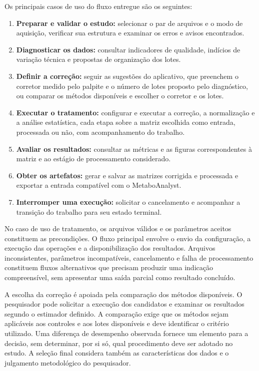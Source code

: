 Os principais casos de uso do fluxo entregue são os seguintes:
\begin{enumerate}
\item \textbf{Preparar e validar o estudo:} selecionar o par de arquivos e o modo de aquisição, verificar sua estrutura e examinar os erros e avisos encontrados.
\item \textbf{Diagnosticar os dados:} consultar indicadores de qualidade, indícios de variação técnica e propostas de organização dos lotes.
\item \textbf{Definir a correção:} seguir as sugestões do aplicativo, que preenchem o corretor medido pelo palpite e o número de lotes proposto pelo diagnóstico, ou comparar os métodos disponíveis e escolher o corretor e os lotes.
\item \textbf{Executar o tratamento:} configurar e executar a correção, a normalização e a análise estatística, cada etapa sobre a matriz escolhida como entrada, processada ou não, com acompanhamento do trabalho.
\item \textbf{Avaliar os resultados:} consultar as métricas e as figuras correspondentes à matriz e ao estágio de processamento considerado.
\item \textbf{Obter os artefatos:} gerar e salvar as matrizes corrigida e processada e exportar a entrada compatível com o MetaboAnalyst.
\item \textbf{Interromper uma execução:} solicitar o cancelamento e acompanhar a transição do trabalho para seu estado terminal.
\end{enumerate}

No caso de uso de tratamento, os arquivos válidos e os parâmetros aceitos constituem as precondições. O fluxo principal envolve o envio da configuração, a execução das operações e a disponibilização dos resultados. Arquivos inconsistentes, parâmetros incompatíveis, cancelamento e falha de processamento constituem fluxos alternativos que precisam produzir uma indicação compreensível, sem apresentar uma saída parcial como resultado concluído.

A escolha da correção é apoiada pela comparação dos métodos disponíveis. O pesquisador pode solicitar a execução dos candidatos e examinar os resultados segundo o estimador definido. A comparação exige que os métodos sejam aplicáveis aos controles e aos lotes disponíveis e deve identificar o critério utilizado. Uma diferença de desempenho observada fornece um elemento para a decisão, sem determinar, por si só, qual procedimento deve ser adotado no estudo. A seleção final considera também as características dos dados e o julgamento metodológico do pesquisador.

